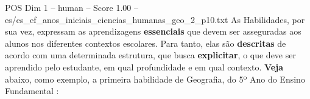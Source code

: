 \begin{textsample}{POS Dim 1 – human – Score 1.00 – es/es\_ef\_anos\_iniciais\_ciencias\_humanas\_geo\_2\_p10.txt}  \label{ex:f1_pos_015}
As Habilidades, por sua vez, expressam as aprendizagens \textbf{essenciais} que devem ser asseguradas aos alunos nos diferentes contextos escolares.
Para tanto, elas são \textbf{descritas} de acordo com uma determinada estrutura, que busca \textbf{explicitar}, o que deve ser aprendido pelo estudante, em qual profundidade e em qual contexto. \textbf{Veja} abaixo, como exemplo, a primeira habilidade de Geografia, do 5º Ano do Ensino Fundamental :

\end{textsample}
